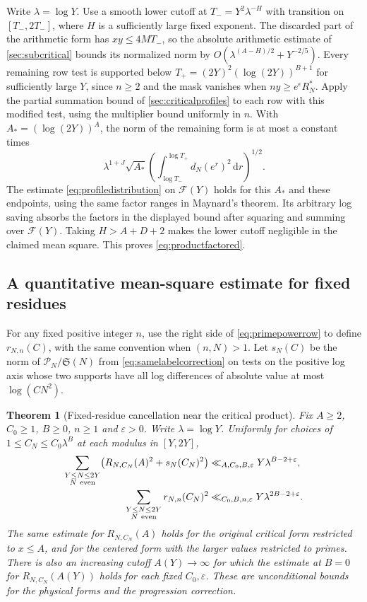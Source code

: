\documentclass[11pt,a4paper]{article}
\numberwithin{equation}{section}
\newtheorem{theorem}{Theorem}[section]
\newcommand{\SSS}{\mathfrak S}
\newcommand{\ud}{\mathrm d}
\begin{document}
Write $\lambda=\log Y$. Use a smooth lower cutoff at
$T_-=Y^2\lambda^{-H}$ with transition on $[T_-,2T_-]$,
where $H$ is a sufficiently large fixed exponent.
The discarded part of the arithmetic form has
$xy\le4M T_-$, so the absolute arithmetic estimate of
\cref{sec:subcritical} bounds its normalized norm by
$O(\lambda^{(A-H)/2}+Y^{-2/5})$.
Every remaining row test is supported below
$T_+=(2Y)^2(\log(2Y))^{B+1}$ for sufficiently large $Y$,
since $n\ge2$ and the mask vanishes when
$ny\ge e^\epsilon R_N^*$. Apply the partial summation bound
of \cref{sec:criticalprofiles} to each row with this
modified test, using the multiplier bound uniformly in $n$.
With $A_*=(\log(2Y))^A$, the norm of the remaining form
is at most a constant times
\[
 \lambda^{1+J}\sqrt{A_*}
    \left(\int_{\log T_-}^{\log T_+}d_N(e^r)^2\,\ud r\right)^{1/2}.
\]
The estimate \eqref{eq:profiledistribution} on $\mathcal F(Y)$
holds for this $A_*$ and these endpoints, using the same
factor ranges in Maynard's theorem. Its arbitrary log saving
absorbs the factors in the displayed bound after squaring and
summing over $\mathcal F(Y)$. Taking $H>A+D+2$ makes the
lower cutoff negligible in the claimed mean square. This
proves \cref{eq:productfactored}.

\subsection{A quantitative mean-square estimate for fixed residues}

For any fixed positive integer $n$, use the right side of
\cref{eq:primepowerrow} to define $r_{N,n}(C)$, with the same
convention when $(n,N)>1$. Let $s_N(C)$ be the norm of
$\mathcal P_N/\SSS(N)$ from \cref{eq:samelabelcorrection} on
tests on the positive log axis whose two supports have all
log differences of absolute value at most $\log(CN^2)$.

\begin{theorem}[Fixed-residue cancellation near the critical product]
\label{thm:fixedrowmeansquare}
Fix $A\ge2$, $C_0\ge1$, $B\ge0$, $n\ge1$ and $\varepsilon>0$.
Write $\lambda=\log Y$. Uniformly for choices of
$1\le C_N\le C_0\lambda^B$ at each modulus in $[Y,2Y]$,
\begin{align}
 \sum_{\substack{Y\le N\le2Y\\N\ {\rm even}}}
     \bigl(R_{N,C_N}(A)^2+s_N(C_N)^2\bigr)
       &\ll_{A,C_0,B,\varepsilon} Y\lambda^{B-2+\varepsilon},
 \label{eq:fixedrowmeansquare}
 \\
 \sum_{\substack{Y\le N\le2Y\\N\ {\rm even}}}r_{N,n}(C_N)^2
       &\ll_{C_0,B,n,\varepsilon} Y\lambda^{2B-2+\varepsilon}.
 \label{eq:fixedrowprefixmeansquare}
\end{align}
The same estimate for $R_{N,C_N}(A)$ holds for the original
critical form restricted to $x\le A$, and for the centered
form with the larger values restricted to primes.
There is also an increasing cutoff $A(Y)\to\infty$ for which
the estimate at $B=0$ for $R_{N,C_N}(A(Y))$ holds for each
fixed $C_0,\varepsilon$. These are unconditional bounds
for the physical forms and the progression correction.
\end{theorem}
\end{document}
